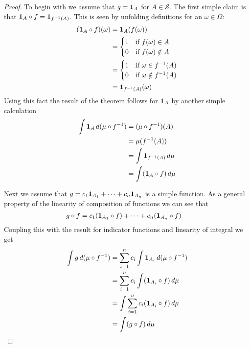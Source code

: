 \documentclass{amsart}
\theoremstyle{remark}
\theoremstyle{definition}
\begin{document}
\begin{proof}
To begin with we assume that $g = \textbf{1}_{A}$ for $A \in
\mathcal{S}$.  The first simple claim is that $\textbf{1}_{A}
\circ f = \textbf{1}_{f^{-1}(A)}$.  This is seen by unfolding
definitions for an $\omega \in \Omega$:
\begin{align*}
(\textbf{1}_{A} \circ f)(\omega) &= \textbf{1}_{A} (f(\omega)) \\
&= \begin{cases}
1 &\text{if $f(\omega) \in A$}\\
0 &\text{if $f(\omega) \notin A$}
\end{cases}\\
&= \begin{cases}
1 &\text{if $\omega \in f^{-1}(A)$}\\
0 &\text{if $\omega \notin f^{-1}(A)$}
\end{cases}\\
&= \textbf{1}_{f^{-1}(A)}(\omega)
\end{align*}
Using this fact the result of the theorem follows for
$\textbf{1}_{A}$ by another simple calculation
\begin{align*}
\int \textbf{1}_{A} \, d (\mu \circ f^{-1}) &= (\mu \circ f^{-1})(A)
\\
&= \mu(f^{-1}(A)) \\
&= \int \textbf{1}_{f^{-1}(A)} \, d\mu \\
&= \int (\textbf{1}_{A} \circ f) \, d\mu
\end{align*}

Next we assume that $g = c_1 \textbf{1}_{A_1} + \cdots + c_n
\textbf{1}_{A_n}$ is a simple function. As a general property of
the linearity of composition of functions we can see that 
\begin{align*}
g \circ f
&= c_1 (\textbf{1}_{A_1} \circ f) + \cdots + c_n (\textbf{1}_{A_n} \circ f)
\end{align*}
Coupling this with the result for indicator functions and linearity of
integral we get
\begin{align*}
\int g \, d (\mu \circ f^{-1}) &= \sum_{i=1}^n c_i \int \textbf{1}_{A_i} \, d (\mu \circ f^{-1})
\\
&= \sum_{i=1}^n c_i \int (\textbf{1}_{A_i} \circ f) \, d \mu \\
&=  \int \sum_{i=1}^n c_i (\textbf{1}_{A_i} \circ f) \, d \mu \\
&= \int (g \circ f) \, d\mu
\end{align*}


\end{proof}
\end{document}
